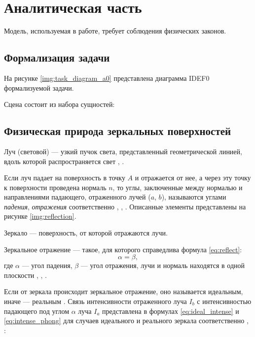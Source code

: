 \chapter{Аналитическая часть}

Модель, используемая в работе, требует соблюдения физических законов.

\section{Формализация задачи}

На рисунке \ref{img:task_diagram_a0} представлена диаграмма IDEF0 формализуемой задачи.


Сцена состоит из набора сущностей:



\section{Физическая природа зеркальных поверхностей}

Луч (световой) --- узкий пучок света, представленный геометрической линией, вдоль которой распространяется свет \cite{тюрин2005физика}, \cite{оптика20036}. 

Если луч падает на поверхность в точку $A$ и отражается от нее, а через эту точку к поверхности проведена нормаль $n$, то углы, заключенные между нормалью и направлениями падающего, отраженного лучей ($a$, $b$), называются углами \textit{падения}, \textit{отражения} соответственно \cite{тюрин2005физика}, \cite{оптика20036}, \cite{rodionov}.
Описанные элементы представлены на рисунке \ref{img:reflection}.


Зеркало --- поверхность, от которой отражаются лучи.

Зеркальное отражение --- такое, для которого справедлива формула \ref{eq:reflect}:
\begin{equation}\label{eq:reflect}
	\alpha=\beta,
\end{equation}
где $\alpha$ --- угол падения, $\beta$ --- угол отражения, лучи и нормаль находятся в одной плоскости \cite{порев2002компьютерная}, \cite{оптика20036}, \cite{rodionov}.

Если от зеркала происходит зеркальное отражение, оно называется идеальным, иначе --- реальным \cite{порев2002компьютерная}. Связь интенсивности отраженного луча $I_b$ с интенсивностью падающего под углом $\alpha$ луча $I_a$ представлена в формулах \ref{eq:ideal_intense} и \ref{eq:intense_phong} для случаев идеального и реального зеркала соответственно \cite{порев2002компьютерная}, \cite{оптика20036}:


